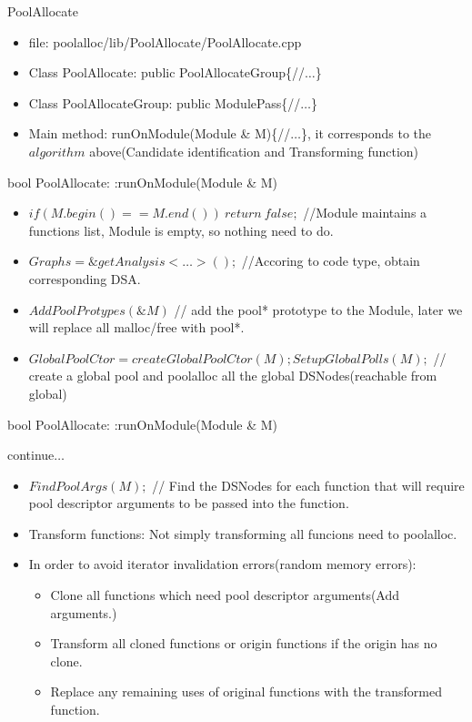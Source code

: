 \documentclass{beamer}
\begin{document}
\begin{frame}{PoolAllocate}
  \begin{itemize}
\setlength{\itemsep}{0.5cm}
	\item file: poolalloc/lib/PoolAllocate/PoolAllocate.cpp
	\item Class PoolAllocate: public PoolAllocateGroup\{//$\dots$\}
	\item Class PoolAllocateGroup: public ModulePass\{//$\dots$\}
	\item Main method: runOnModule(Module \& M)\{//$\dots$\}, it corresponds to the $algorithm$ above(Candidate identification and Transforming function)
  \end{itemize}
\end{frame}

\begin{frame}{bool PoolAllocate: :runOnModule(Module \& M)}
  \begin{block}{}
  \begin{itemize}
\setlength{\itemsep}{0.5cm}
	\item $if (M.begin() = = M.end()) \ return\ false;$ //Module maintains a functions list, Module is empty, so nothing need to do.
	\item $Graphs = \&getAnalysis<\dots>();$ //Accoring to code type, obtain corresponding DSA.
	\item $AddPoolProtypes(\&M)$ // add the pool* prototype to the Module, later we will replace all malloc/free with pool*.
	\item $GlobalPoolCtor = createGlobalPoolCtor(M); SetupGlobalPolls(M);$ // create a global pool and poolalloc all the global DSNodes(reachable from global)
  \end{itemize}
\end{block}
\end{frame}

\begin{frame}{bool PoolAllocate: :runOnModule(Module \& M)}
  \begin{block}{
	continue$\dots$}
  \begin{itemize}
\setlength{\itemsep}{0.5cm}
\item $FindPoolArgs(M);$ // Find the DSNodes for each function that will require pool descriptor arguments to be passed into the function.
	\item Transform functions: Not simply transforming all funcions need to poolalloc.
	\item In order to avoid iterator invalidation errors(random memory errors):
	  \begin{itemize}
		\item Clone all functions which need pool descriptor arguments(Add arguments.)
		  \item Transform all cloned functions or origin functions if the origin has no clone.
		  \item Replace any remaining uses of original functions with the transformed function.
	  \end{itemize}
  \end{itemize}
\end{block}
\end{frame}
\end{document}
